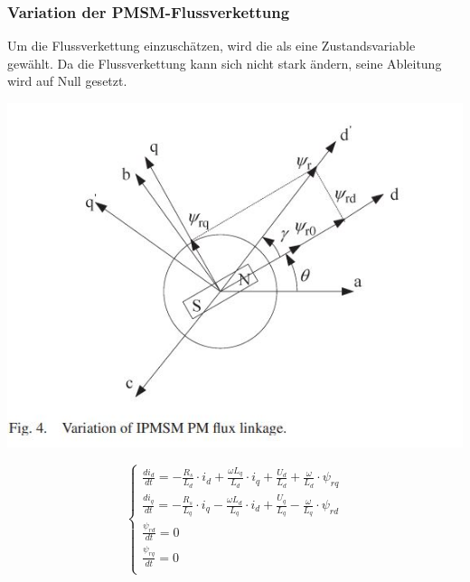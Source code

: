 \documentclass[serif,11pt, xcolor=table]{beamer}
\begin{document}
\begin{frame}
	\frametitle{Variation der PMSM-Flussverkettung}
	  
	Um die Flussverkettung einzuschätzen, wird die als eine Zustandsvariable gewählt. Da die Flussverkettung kann sich nicht stark ändern, seine Ableitung wird auf Null gesetzt.\\
	\begin{floatingfigure}[r]{0.38\linewidth}
		\includegraphics[scale=0.46]{Abbildungen/Fluxdq.JPG}
		
	\end{floatingfigure}
	\vskip 0.2cm
	$$\left\{\begin{array}{l}
		\frac{di_{d}}{dt}=-\frac{R_{s}}{L_{d}}\cdot i_{d}+\frac{\omega L_{q}}{L_{d}}\cdot i_{q}+\frac{U_{d}}{L_{d}}+\frac{\omega}{L_{d}}\cdot \psi_{rq}\\ \frac{di_{q}}{dt}=-\frac{R_{s}}{L_{q}}\cdot i_{q}-\frac{\omega L_{d}}{L_{q}}\cdot i_{d}+\frac{U_{q}}{L_{q}}-\frac{\omega}{L_{q}}\cdot \psi_{rd}
		\\\frac{\psi_{rd}}{dt}=0\\
		\frac{\psi_{rq}}{dt}=0\\
	\end{array}\right.$$
	
\end{frame}
\end{document}
